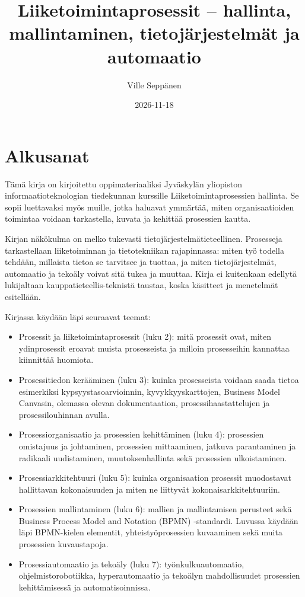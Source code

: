 \documentclass[
  finnish,
  letterpaper,
  DIV=11,
  numbers=noendperiod,
  oneside]{scrreprt}
\title{Liiketoimintaprosessit -- hallinta, mallintaminen,
tietojärjestelmät ja automaatio}
\author{Ville Seppänen}
\date{2026-11-18}
\providecommand{\tightlist}{%
  \setlength{\itemsep}{0pt}\setlength{\parskip}{0pt}}
\renewcommand*\contentsname{Sisällysluettelo}
\newcommand\contentsname{Sisällysluettelo}
\begin{document}
\maketitle

\renewcommand*\contentsname{Sisällysluettelo}
{
\setcounter{tocdepth}{2}
\tableofcontents
}


\chapter*{Alkusanat}\label{alkusanat}


Tämä kirja on kirjoitettu oppimateriaaliksi Jyväskylän yliopiston
informaatioteknologian tiedekunnan kurssille Liiketoimintaprosessien
hallinta. Se sopii luettavaksi myös muille, jotka haluavat ymmärtää,
miten organisaatioiden toimintaa voidaan tarkastella, kuvata ja kehittää
prosessien kautta.

Kirjan näkökulma on melko tukevasti tietojärjestelmätieteellinen.
Prosesseja tarkastellaan liiketoiminnan ja tietotekniikan rajapinnassa:
miten työ todella tehdään, millaista tietoa se tarvitsee ja tuottaa, ja
miten tietojärjestelmät, automaatio ja tekoäly voivat sitä tukea ja
muuttaa. Kirja ei kuitenkaan edellytä lukijaltaan
kauppatieteellis-teknistä taustaa, koska käsitteet ja menetelmät
esitellään.

Kirjassa käydään läpi seuraavat teemat:

\begin{itemize}
\tightlist
\item
  Prosessit ja liiketoimintaprosessit (luku 2): mitä prosessit ovat,
  miten ydinprosessit eroavat muista prosesseista ja milloin
  prosesseihin kannattaa kiinnittää huomiota.
\item
  Prosessitiedon kerääminen (luku 3): kuinka prosesseista voidaan saada
  tietoa esimerkiksi kypsyystasoarvioinnin, kyvykkyyskarttojen, Business
  Model Canvasin, olemassa olevan dokumentaation, prosessihaastattelujen
  ja prosessilouhinnan avulla.
\item
  Prosessiorganisaatio ja prosessien kehittäminen (luku 4): prosessien
  omistajuus ja johtaminen, prosessien mittaaminen, jatkuva parantaminen
  ja radikaali uudistaminen, muutoksenhallinta sekä prosessien
  ulkoistaminen.
\item
  Prosessiarkkitehtuuri (luku 5): kuinka organisaation prosessit
  muodostavat hallittavan kokonaisuuden ja miten ne liittyvät
  kokonaisarkkitehtuuriin.
\item
  Prosessien mallintaminen (luku 6): mallien ja mallintamisen perusteet
  sekä Business Process Model and Notation (BPMN) -standardi. Luvussa
  käydään läpi BPMN-kielen elementit, yhteistyöprosessien kuvaaminen
  sekä muita prosessien kuvaustapoja.
\item
  Prosessiautomaatio ja tekoäly (luku 7): työnkulkuautomaatio,
  ohjelmistorobotiikka, hyperautomaatio ja tekoälyn mahdollisuudet
  prosessien kehittämisessä ja automatisoinnissa.
\end{itemize}
\end{document}
